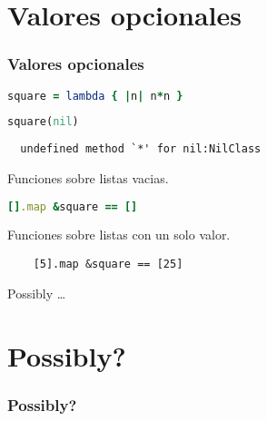 \documentclass{beamer}
\begin{document}
\section{Valores opcionales}
\begin{frame}[fragile]
  \frametitle{Valores opcionales}

  \begin{lstlisting}[language=Ruby]
    square = lambda { |n| n*n }
  \end{lstlisting}
  \begin{lstlisting}[language=Ruby]
    square(nil)
  \end{lstlisting}

  \begin{verbatim}
  undefined method `*' for nil:NilClass
  \end{verbatim}

  Funciones sobre listas vacias.
  \begin{lstlisting}[language=Ruby]
    [].map &square == []
  \end{lstlisting}
  Funciones sobre listas con un solo valor.
  \begin{lstlisting}
    [5].map &square == [25]
  \end{lstlisting}
  Possibly \ldots
\end{frame}

\section{Possibly?}
\begin{frame}[fragile]
  \frametitle{Possibly?}
\end{frame}
\end{document}
